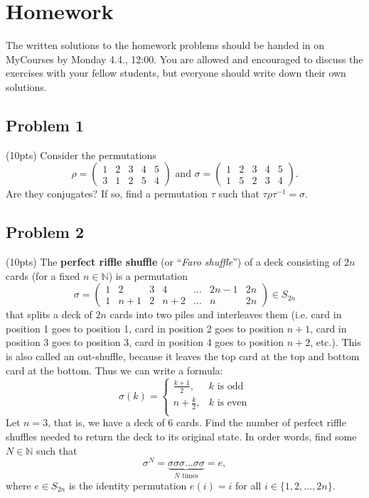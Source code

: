 \documentclass{amsart}
\newcommand{\N}{\mathbb{N}}
\theoremstyle{definition} \newtheorem*{definition}{Definition}
\theoremstyle{remark} \newtheorem*{ex}{Example}
\begin{document}
\pagebreak

 \section*{Homework}
The written solutions to the homework problems should be handed in on MyCourses by Monday 4.4., 12:00. You are allowed and encouraged to discuss the exercises with your fellow students, but everyone should write down their own solutions.

\subsection*{Problem 1}(10pts)
Consider the permutations $$\rho=\begin{pmatrix}1&2&3&4&5\\3&1&2&5&4\end{pmatrix}\mbox{ and }\sigma=\begin{pmatrix}1&2&3&4&5\\1&5&2&3&4\end{pmatrix}.$$ Are they conjugates? If so, find a permutation $\tau$ such that $\tau\rho\tau^{-1}=\sigma$.

\subsection*{Problem 2}(10pts)
The \textbf{perfect riffle shuffle} (or ``\textit{Faro shuffle}'') of a deck consisting of $2n$ cards (for a fixed $n \in \N$) is a permutation 
$$\sigma = \begin{pmatrix}1&2&3&4&\dots&  2n-1 & 2n \\1&n+1&2&n+2&\dots & n & 2n\end{pmatrix} \in S_{2n}$$
that splits a deck of $2n$ cards into two piles and interleaves them (i.e. card in position 1 goes to position 1, card in position 2 goes to position $n+1$, card in position 3 goes to position 3, card in position 4 goes to position $n+2$, etc.).  This is also called an out-shuffle, because it leaves the top card at the top and bottom card at the bottom. Thus we can write a formula:
$$\sigma(k) = \begin{cases}
\frac{k+1}{2}, & k \text{ is odd}\\
n+\frac{k}{2}, & k \text{ is even}\\
\end{cases}$$
Let $n = 3$, that is, we have a deck of $6$ cards. Find the number of perfect riffle shuffles needed to return the deck to its original state. In order words, find some $N \in \N$ such that 
$$\sigma^N = \underbrace{\sigma \sigma \sigma \dots \sigma \sigma}_{N \text{ times}} =  e,$$
where $e \in S_{2n}$ is the identity permutation $e(i) = i$ for all $i \in \{1,2,\dots,2n\}$. 
\end{document}
